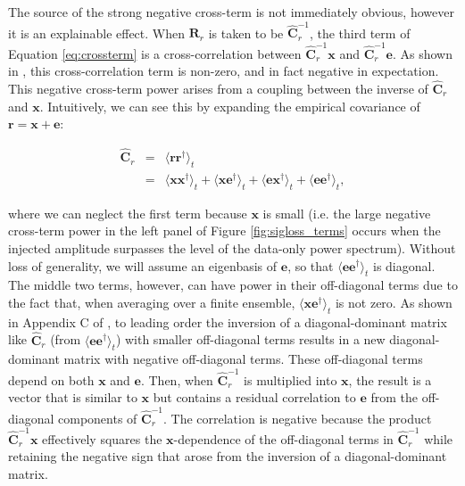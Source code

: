 \documentclass[preprint2,numberedappendix,tighten]{aastex6}
\begin{document}
The source of the strong negative cross-term is not immediately obvious, however it is an explainable effect. 
When $\textbf{R}_{r}$
is taken to be $\widehat{\textbf{C}}_{r}^{-1}$, the third term of Equation \eqref{eq:crossterm} is a cross-correlation between $\widehat{\textbf{C}}_{r}^{-1}\textbf{x}$ and
$\widehat{\textbf{C}}_{r}^{-1}\textbf{e}$. As shown in \citet{switzer_et_al2015}, this cross-correlation term is non-zero, and in fact negative in expectation. 
This negative cross-term power arises from a coupling between the inverse of 
$\widehat{\textbf{C}}_{r}$ and $\mathbf{x}$. 
Intuitively, we can see this by expanding the empirical covariance of $\textbf{r}=\textbf{x}+\textbf{e}$:

\begin{eqnarray}
\widehat{\textbf{C}}_{r} &=& \langle \textbf{rr}^{\dagger} \rangle_{t} \nonumber \\ 
&=& \langle \textbf{xx}^{\dagger} \rangle_{t} + \langle \textbf{xe}^{\dagger} \rangle_{t} + \langle \textbf{ex}^{\dagger} \rangle_{t} + \langle 
\textbf{ee}^{\dagger} \rangle_{t},
\end{eqnarray}

\noindent where we can neglect the first term because $\textbf{x}$ is small (i.e. the large negative cross-term power in the left panel of Figure \ref{fig:sigloss_terms} occurs when the injected amplitude surpasses the level of the data-only power spectrum).  Without loss of generality, we will assume
an eigenbasis of $\textbf{e}$, so that $\langle 
\textbf{ee}^{\dagger} \rangle_{t}$ is diagonal. The middle 
two terms, however, can have power in their off-diagonal terms due to the fact that, when averaging over a finite
ensemble, $\langle\textbf{xe}^\dagger\rangle_t$ is not zero.  As shown in Appendix C of \citet{parsons_et_al2014}%
, to leading order the inversion of a diagonal-dominant matrix like $\widehat{\textbf{C}}_{r}$ (from $\langle 
\textbf{ee}^{\dagger} \rangle_{t}$) with smaller
off-diagonal terms results in a new diagonal-dominant matrix with negative off-diagonal terms. These off-diagonal
terms depend on both $\textbf{x}$ and $\textbf{e}$. Then, when $\widehat{\textbf{C}}^{-1}_{r}$ is multiplied into $\textbf{x}$,
the result is a vector that is similar to $\textbf{x}$ but
contains a residual correlation to $\textbf{e}$ from the off-diagonal components of $\widehat{\textbf{C}}^{-1}_{r}$. The
correlation is negative because the product $\widehat{\textbf{C}}_r^{-1}\textbf{x}$ effectively squares the $\textbf{x}$-dependence
of the off-diagonal terms in $\widehat{\textbf{C}}^{-1}_{r}$ while retaining the negative sign that arose from the inversion
of a diagonal-dominant matrix.
\end{document}
